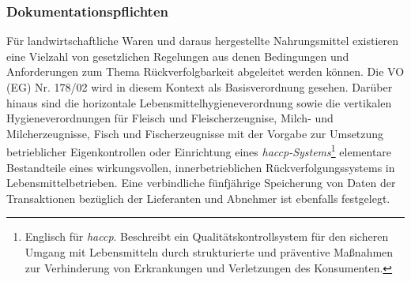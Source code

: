 
\subsubsection{Dokumentationspflichten}
Für landwirtschaftliche Waren und daraus hergestellte Nahrungsmittel existieren eine Vielzahl von gesetzlichen Regelungen aus denen Bedingungen und Anforderungen zum Thema Rückverfolgbarkeit abgeleitet werden können. Die VO (EG) Nr. 178/02 \citep{EPER2002} wird in diesem Kontext als Basisverordnung gesehen. Darüber hinaus sind die horizontale Lebensmittelhygieneverordnung sowie die vertikalen Hygieneverordnungen für Fleisch und Fleischerzeugnise, Milch- und Milcherzeugnisse, Fisch und Fischerzeugnisse mit der Vorgabe zur Umsetzung betrieblicher Eigenkontrollen oder Einrichtung eines \textit{\acs{haccp}-Systems}\footnote{Englisch für \textit{\acf{haccp}}. Beschreibt ein Qualitätskontrollsystem für den sicheren Umgang mit Lebensmitteln durch strukturierte und präventive Maßnahmen zur Verhinderung von Erkrankungen und Verletzungen des Konsumenten.\citep{EPER2004}} elementare Bestandteile eines wirkungsvollen, innerbetrieblichen Rückverfolgungssystems in Lebensmittelbetrieben. Eine verbindliche fünfjährige Speicherung von Daten der Transaktionen bezüglich der Lieferanten und Abnehmer ist ebenfalls festgelegt.\\

